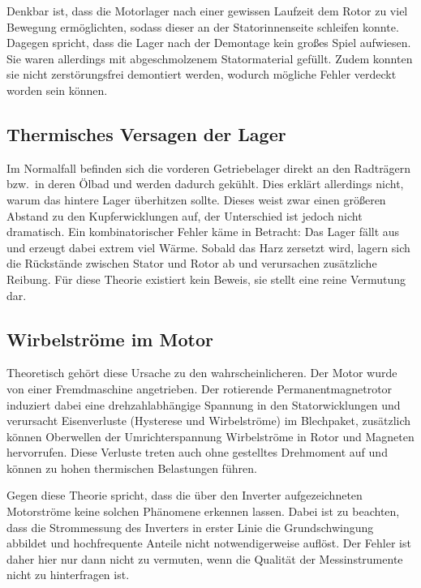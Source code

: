 Denkbar ist, dass die Motorlager nach einer gewissen Laufzeit dem Rotor zu viel Bewegung ermöglichten, sodass dieser an der Statorinnenseite schleifen konnte. Dagegen spricht, dass die Lager nach der Demontage kein großes Spiel aufwiesen. Sie waren allerdings mit abgeschmolzenem Statormaterial gefüllt. Zudem konnten sie nicht zerstörungsfrei demontiert werden, wodurch mögliche Fehler verdeckt worden sein können.

\subsection{Thermisches Versagen der Lager}
\label{subsec:hyp_lager_therm}

Im Normalfall befinden sich die vorderen Getriebelager direkt an den Radträgern bzw.\ in deren Ölbad und werden dadurch gekühlt. Dies erklärt allerdings nicht, warum das hintere Lager überhitzen sollte. Dieses weist zwar einen größeren Abstand zu den Kupferwicklungen auf, der Unterschied ist jedoch nicht dramatisch. Ein kombinatorischer Fehler käme in Betracht: Das Lager fällt aus und erzeugt dabei extrem viel Wärme. Sobald das Harz zersetzt wird, lagern sich die Rückstände zwischen Stator und Rotor ab und verursachen zusätzliche Reibung. Für diese Theorie existiert kein Beweis, sie stellt eine reine Vermutung dar.

\subsection{Wirbelströme im Motor}
\label{subsec:hyp_wirbelstroeme}

Theoretisch gehört diese Ursache zu den wahrscheinlicheren. Der Motor wurde von einer Fremdmaschine angetrieben. Der rotierende Permanentmagnetrotor induziert dabei eine drehzahlabhängige Spannung in den Statorwicklungen und verursacht Eisenverluste (Hysterese und Wirbelströme) im Blechpaket, zusätzlich können Oberwellen der Umrichterspannung Wirbelströme in Rotor und Magneten hervorrufen. Diese Verluste treten auch ohne gestelltes Drehmoment auf und können zu hohen thermischen Belastungen führen.

Gegen diese Theorie spricht, dass die über den Inverter aufgezeichneten Motorströme keine solchen Phänomene erkennen lassen. Dabei ist zu beachten, dass die Strommessung des Inverters in erster Linie die Grundschwingung abbildet und hochfrequente Anteile nicht notwendigerweise auflöst. Der Fehler ist daher hier nur dann nicht zu vermuten, wenn die Qualität der Messinstrumente nicht zu hinterfragen ist.

